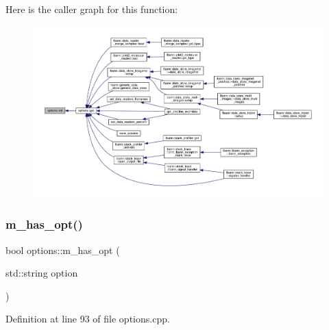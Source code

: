 Here is the caller graph for this function\+:\nopagebreak
\begin{figure}[H]
\begin{center}
\leavevmode
\includegraphics[width=350pt]{classoptions_a6d909eacd89dee5f0b153430985f9822_icgraph}
\end{center}
\end{figure}
\mbox{\label{classoptions_a99183ba43c8d7b35dbfa1bea0f43db48}} 
\subsubsection{\texorpdfstring{m\+\_\+has\+\_\+opt()}{m\_has\_opt()}}
{\footnotesize\ttfamily bool options\+::m\+\_\+has\+\_\+opt (\begin{DoxyParamCaption}\item[{std\+::string}]{option }\end{DoxyParamCaption})\hspace{0.3cm}{\ttfamily [private]}}



Definition at line 93 of file options.\+cpp.


